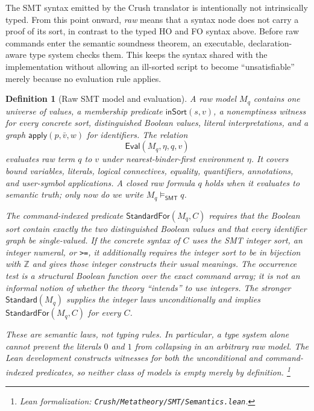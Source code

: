 \documentclass[11pt]{article}
\newtheorem{definition}{Definition}[section]
\theoremstyle{remark}
\newcommand{\leanfile}[1]{\footnote{Lean formalization: \texttt{Crush/Metatheory/#1}.}}
\begin{document}
The SMT syntax emitted by the Crush translator is intentionally not intrinsically
typed. From this point onward, \emph{raw} means that a syntax node does not carry
a proof of its sort, in contrast to the typed HO and FO syntax above. Before raw
commands enter the semantic soundness theorem, an executable, declaration-aware
type system checks them. This keeps the syntax shared with the implementation
without allowing an ill-sorted script to become ``unsatisfiable'' merely because
no evaluation rule applies.

\begin{definition}[Raw SMT model and evaluation]
A raw model $M_q$ contains one universe of values, a membership predicate
$\mathsf{inSort}(s,v)$, a nonemptiness witness for every concrete sort,
distinguished Boolean values, literal interpretations, and a graph
$\mathsf{apply}(p,\bar v,w)$ for identifiers. The relation
\[
 \mathsf{Eval}(M_q,\eta,q,v)
\]
evaluates raw term $q$ to $v$ under nearest-binder-first environment $\eta$.
It covers bound variables, literals, logical connectives, equality,
quantifiers, annotations, and user-symbol applications. A closed raw formula
$q$ holds when it evaluates to semantic truth; only now do we write
$M_q\models_{\mathsf{SMT}}q$.

The command-indexed predicate $\mathsf{StandardFor}(M_q,C)$ requires that the
Boolean sort contain exactly the two distinguished Boolean values and that
every identifier graph be single-valued. If the concrete syntax of $C$ uses
the SMT integer sort, an integer numeral, or \texttt{>=}, it additionally
requires the integer sort to be in bijection with $\mathbb Z$ and gives those
integer constructs their usual meanings. The occurrence test is a structural
Boolean function over the exact command array; it is not an informal notion of
whether the theory ``intends'' to use integers. The stronger
$\mathsf{Standard}(M_q)$ supplies the integer laws unconditionally and implies
$\mathsf{StandardFor}(M_q,C)$ for every $C$.

These are semantic laws, not typing rules. In particular, a type system alone
cannot prevent the literals $0$ and $1$ from collapsing in an arbitrary raw
model. The Lean development constructs witnesses for both the unconditional
and command-indexed predicates, so neither class of models is empty merely by
definition.
\leanfile{SMT/Semantics.lean}
\end{definition}
\end{document}
